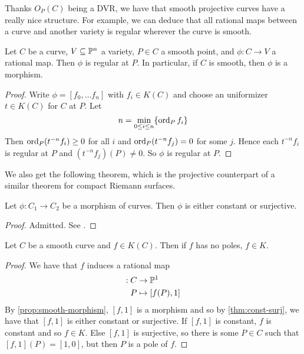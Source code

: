 Thanks $O_P(C)$ being a DVR, we have that smooth projective curves
have a really nice structure.
For example, we can deduce that all rational maps between a curve
and another variety is regular wherever the curve is smooth.

\begin{proposition}
	\label{prop:smooth-morphism}
	Let $C$ be a curve, $V \subseteq \mathbb{P}^n$ a variety,
	$P \in C$ a smooth point, and $\phi: C \to V$ a rational map.
	Then $\phi$ is regular at $P$. In particular, if $C$ is smooth, 
	then $\phi$ is a morphism.
\end{proposition}
\begin{proof}
	Write $\phi = [f_0, \dots f_n]$ with $f_i \in K(C)$
	and choose an uniformizer $t \in K(C)$ for $C$ at $P$.
	Let 
	\begin{equation*}
		n = \min_{0 \leq i \leq n}\{\operatorname{ord}_P f_i\}
	\end{equation*}
	Then $\operatorname{ord}_P(t^{-n}f_i) \geq 0$ for all $i$ and $\operatorname{ord}_P(t^{-n}f_j) = 0$
	for some $j$. Hence each $t^{-n}f_i$ is regular at $P$ and
	$(t^{-n}f_j)(P) \neq 0$. So $\phi$ is regular at $P$.
\end{proof}

We also get the following theorem, which is the projective counterpart of a
similar theorem for compact Riemann surfaces.

\begin{theorem}
	\label{thm:const-surj}
	Let $\phi: C_1 \to C_2$ be a morphism of curves. Then $\phi$ is either
	constant or surjective.
\end{theorem}
\begin{proof}
	Admitted. See \cite[II.6.8]{hartshorne}.
\end{proof}

\begin{corollary}
	\label{prop:curves-poles}
	Let $C$ be a smooth curve and $f \in K(C)$. Then if $f$ has no poles,
	$f \in K$.
\end{corollary}

\begin{proof}
	We have that $f$ induces a rational map
	\begin{align*}
		[f, 1]: C&\to \proj^1\\
		P &\mapsto [f(P), 1]
	\end{align*}
	By \ref{prop:smooth-morphism}, $[f, 1]$ is a morphism and
	so by \ref{thm:const-surj}, we have that $[f, 1]$ is either constant
	or surjective. If $[f, 1]$ is constant, $f$ is constant and so $f \in K$.
	Else $[f, 1]$ is surjective, so there is some $P \in C$ such that
	$[f, 1](P) = [1, 0]$, but then $P$ is a pole of $f$.
\end{proof}

